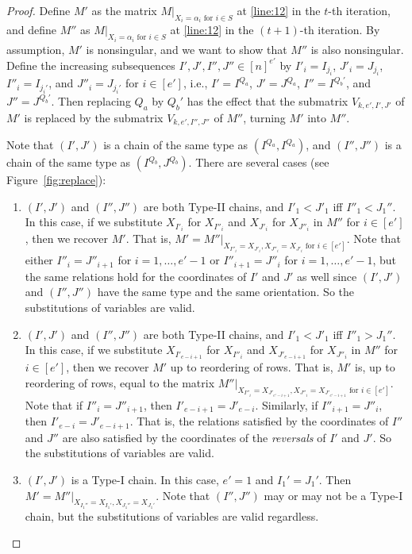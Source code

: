 \documentclass[11pt]{article}
\theoremstyle{plain}
\theoremstyle{definition}
\theoremstyle{remark}
\begin{document}
\begin{proof}
Define $M'$ as the matrix $M|_{X_i=\alpha_i \text{ for } i\in S}$
at \cref{line:12} in the $t$-th iteration,
and define $M''$ as $M|_{X_i=\alpha_i \text{ for } i\in S}$ at \cref{line:12} in the $(t+1)$-th iteration. By assumption, $M'$ is nonsingular, and we want to show that $M''$ is also nonsingular.
Define the increasing subsequences $I',J',I'',J''\in [n]^{e'}$
by $I'_i=I_{j_i}$, $J'_i=J_{j_i}$, $I''_i=I_{j_i'}$, and $J''_i=J_{j_i'}$ for $i\in [e']$, i.e., $I'=I^{Q_a}$, $J'=J^{Q_a}$, $I''=I^{Q_b'}$, and $J''=J^{Q_b'}$.
Then replacing $Q_a$ by $Q_b'$ has the effect that the submatrix $V_{k,e',I',J'}$ of $M'$ is replaced by 
the submatrix $V_{k,e',I'',J''}$ of
$M''$, turning $M'$ into $M''$.



Note that $(I',J')$ is a chain of the same type as $(I^{Q_a}, I^{Q_a})$, and $(I'',J'')$ is a chain of the same type as $(I^{Q_b},J^{Q_b})$.
There are several cases (see Figure~\ref{fig:replace}):
\begin{enumerate}
\item $(I', J')$ and $(I'', J'')$ are both Type-II chains, and $I'_1<J'_1$ iff $I''_1<J_1''$. 
In this case, if we substitute $X_{I'_i}$ for $X_{I''_i}$ and $X_{J'_i}$ for $X_{J''_i}$ in $M''$ for $i\in [e']$, then we recover $M'$. That is, $M'=M''|_{X_{I''_i}=X_{J'_i}, X_{J''_i}=X_{J'_i} \text{ for } i\in [e']}$. Note that either $I''_i=J''_{i+1}$ for $i=1,\dots,e'-1$ or $I''_{i+1}=J''_i$ for $i=1,\dots,e'-1$, but the same relations hold for the coordinates of $I'$ and $J'$ as well since $(I',J')$ and $(I'',J'')$ have the same type and the same orientation. So the substitutions of variables are valid.

\item $(I', J')$ and $(I'', J'')$ are both Type-II chains, and $I'_1<J'_1$ iff $I''_1>J_1''$. 
In this case, if we substitute $X_{I'_{e-i+1}}$ for $X_{I''_i}$ and $X_{J'_{e-i+1}}$ for $X_{J''_i}$ in $M''$ for $i\in [e']$, then we recover $M'$ up to reordering of rows. That is, $M'$ is, up to reordering of rows, equal to the matrix $M''|_{X_{I''_i}=X_{J'_{e'-i+1}}, X_{J''_i}=X_{J'_{e'-i+1}} \text{ for } i\in [e']}$.
Note that if $I''_i=J''_{i+1}$, then $I'_{e-i+1}=J'_{e-i}$. Similarly, if $I''_{i+1}=J''_{i}$, then $I'_{e-i}=J'_{e-i+1}$. That is, the relations satisfied by the coordinates of $I''$ and $J''$ are also satisfied by the coordinates of the \emph{reversals} of $I'$ and $J'$. So the substitutions of variables are valid.

\item $(I', J')$ is a Type-I chain. In this case, $e'=1$ and $I_1'=J_1'$.
Then $M'=M''|_{X_{I_1''}=X_{I_1'}, X_{J_1''}=X_{J_1'}}$. Note that $(I'',J'')$ may or may not be a Type-I chain, but the substitutions of variables are valid regardless.
\end{enumerate}


\end{proof}
\end{document}
